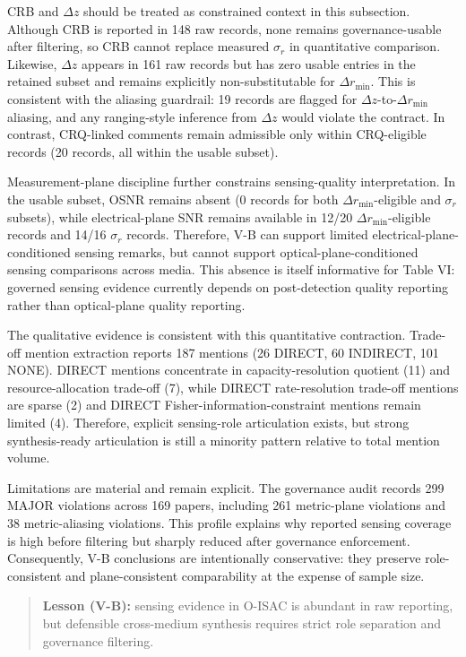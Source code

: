 CRB and $\Delta z$ should be treated as constrained context in this subsection. Although CRB is reported in 148 raw records, none remains governance-usable after filtering, so CRB cannot replace measured $\sigma_r$ in quantitative comparison. Likewise, $\Delta z$ appears in 161 raw records but has zero usable entries in the retained subset and remains explicitly non-substitutable for $\Delta r_{\min}$. This is consistent with the aliasing guardrail: 19 records are flagged for $\Delta z$-to-$\Delta r_{\min}$ aliasing, and any ranging-style inference from $\Delta z$ would violate the contract. In contrast, CRQ-linked comments remain admissible only within CRQ-eligible records (20 records, all within the usable subset).

Measurement-plane discipline further constrains sensing-quality interpretation. In the usable subset, OSNR remains absent (0 records for both $\Delta r_{\min}$-eligible and $\sigma_r$ subsets), while electrical-plane SNR remains available in 12/20 $\Delta r_{\min}$-eligible records and 14/16 $\sigma_r$ records. Therefore, V-B can support limited electrical-plane-conditioned sensing remarks, but cannot support optical-plane-conditioned sensing comparisons across media. This absence is itself informative for Table VI: governed sensing evidence currently depends on post-detection quality reporting rather than optical-plane quality reporting.

The qualitative evidence is consistent with this quantitative contraction. Trade-off mention extraction reports 187 mentions (26 DIRECT, 60 INDIRECT, 101 NONE). DIRECT mentions concentrate in capacity-resolution quotient (11) and resource-allocation trade-off (7), while DIRECT rate-resolution trade-off mentions are sparse (2) and DIRECT Fisher-information-constraint mentions remain limited (4). Therefore, explicit sensing-role articulation exists, but strong synthesis-ready articulation is still a minority pattern relative to total mention volume.

Limitations are material and remain explicit. The governance audit records 299 MAJOR violations across 169 papers, including 261 metric-plane violations and 38 metric-aliasing violations. This profile explains why reported sensing coverage is high before filtering but sharply reduced after governance enforcement. Consequently, V-B conclusions are intentionally conservative: they preserve role-consistent and plane-consistent comparability at the expense of sample size.

\begin{quote}
\textbf{Lesson (V-B):} sensing evidence in O-ISAC is abundant in raw reporting, but defensible cross-medium synthesis requires strict role separation and governance filtering.
\end{quote}

